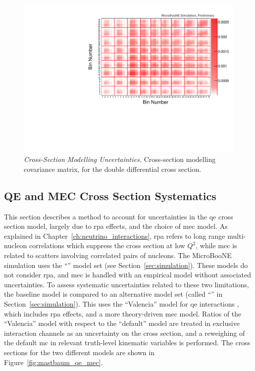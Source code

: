 \begin{figure}[]
\centering
\includegraphics[width=.85\textwidth]{images/genie_covariance_plots/genie_multisim_muangle_mumom_cov_matrix_2d}
\caption[Cross-Section Modelling Uncertainties - Double-Differential Cross Section - Covariance Matrix]{\emph{Cross-Section Modelling Uncertainties.}  Cross-section modelling covariance matrix, for the double differential cross section.}
\label{fig:genie_multisim_muangle_mumom_cov_matrix_2d}
\end{figure}





\clearpage
\subsection{QE and MEC Cross Section Systematics}
\label{sec:error_qemec}

This section describes a method to account for uncertainties in the \acrshort{qe} cross section model, largely due to \acrshort{rpa} effects, and the choice of \acrshort{mec} model. As explained in Chapter~\ref{ch:neutrino_interactions}, \acrshort{rpa} refers to long
range multi-nucleon correlations which suppress the cross section at low $Q^2$, while \acrshort{mec} is related to scatters involving correlated pairs of nucleons. 
The MicroBooNE simulation uses the \g ``\tuneone'' model set (see Section~\ref{sec:simulation}). These models do not consider \acrshort{rpa}, and \acrshort{mec} is handled with an empirical model without associated uncertainties. To assess systematic uncertainties related to these two limitations, the baseline model is compared to an alternative model set (called ``\tunethree'' in Section~\ref{sec:simulation}). This uses the ``Valencia'' model for
\acrshort{qe} interactions \cite{nieves, nieves2}, which includes \acrshort{rpa} effects, and a more theory-driven \acrshort{mec} model. Ratios of the ``Valencia'' model with respect to the ``default'' model are treated in exclusive interaction channels as an uncertainty on the cross section, and a reweighing of the default \acrshort{mc} in relevant truth-level kinematic variables is performed. The cross sections for the two different models are shown in Figure~\ref{fig:mastbaum_qe_mec}.

